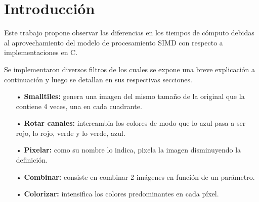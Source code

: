 \section{Introducción}
\par{Este trabajo propone observar las diferencias en los tiempos de cómputo debidas al aprovechamiento del modelo de procesamiento SIMD con respecto a implementaciones en C.}
\par{Se implementaron diversos filtros de los cuales se expone una breve explicación a continuación y luego se detallan en sus respectivas secciones.}
\begin{itemize}
\item[•] \textbf{Smalltiles:} genera una imagen del mismo tamaño de la original que la contiene 4 veces, una en cada cuadrante.
\item[•] \textbf{Rotar canales:} intercambia los colores de modo que lo azul pasa a ser rojo, lo rojo, verde y lo verde, azul.
\item[•] \textbf{Pixelar:} como su nombre lo indica, pixela la imagen disminuyendo la definición.
\item[•] \textbf{Combinar:} consiste en combinar 2 imágenes en función de un parámetro.
\item[•] \textbf{Colorizar:} intensifica los colores predominantes en cada píxel.
\end{itemize}
